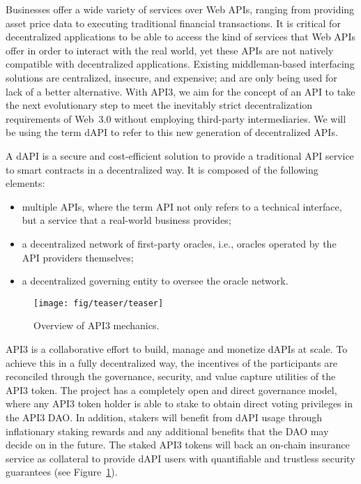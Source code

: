 \documentclass[11pt]{article}
\begin{document}
Businesses offer a wide variety of services over Web APIs, ranging from providing asset price data to executing traditional financial transactions.
It is critical for decentralized applications to be able to access the kind of services that Web APIs offer in order to interact with the real world, yet these APIs are not natively compatible with decentralized applications.
Existing middleman-based interfacing solutions are centralized, insecure, and expensive; and are only being used for lack of a better alternative.
With API3, we aim for the concept of an API to take the next evolutionary step to meet the inevitably strict decentralization requirements of Web~3.0 without employing third-party intermediaries.
We will be using the term dAPI to refer to this new generation of decentralized APIs.

A dAPI is a secure and cost-efficient solution to provide a traditional API service to smart contracts in a decentralized way.
It is composed of the following elements:
\begin{itemize}
    \item multiple APIs, where the term API not only refers to a technical interface, but a service that a real-world business provides;
    \item a decentralized network of first-party oracles, i.e., oracles operated by the API providers themselves;
    \item a decentralized governing entity to oversee the oracle network.
\end{itemize}

\begin{figure}[!t]
    \centering
    \texttt{[image: fig/teaser/teaser]}
	\caption{Overview of API3 mechanics.}
	\label{fig:teaser}
\end{figure}

API3 is a collaborative effort to build, manage and monetize dAPIs at scale.
To achieve this in a fully decentralized way, the incentives of the participants are reconciled through the governance, security, and value capture utilities of the API3 token.
The project has a completely open and direct governance model, where any API3 token holder is able to stake to obtain direct voting privileges in the API3 DAO.
In addition, stakers will benefit from dAPI usage through inflationary staking rewards and any additional benefits that the DAO may decide on in the future.
The staked API3 tokens will back an on-chain insurance service as collateral to provide dAPI users with quantifiable and trustless security guarantees (see Figure~\ref{fig:teaser}).
\end{document}

